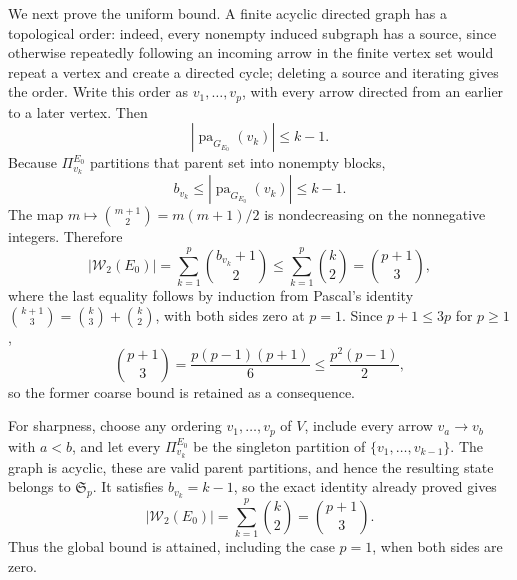 We next prove the uniform bound.  A finite acyclic directed graph has a topological order: indeed, every nonempty induced subgraph has a source, since otherwise repeatedly following an incoming arrow in the finite vertex set would repeat a vertex and create a directed cycle; deleting a source and iterating gives the order.  Write this order as \(v_1,\ldots,v_p\), with every arrow directed from an earlier to a later vertex.  Then
\[
|\operatorname{pa}_{G_{E_0}}(v_k)|\leq k-1.
\]
Because \(\Pi^{E_0}_{v_k}\) partitions that parent set into nonempty blocks,
\[
b_{v_k}\leq|\operatorname{pa}_{G_{E_0}}(v_k)|\leq k-1.
\]
The map \(m\mapsto\binom{m+1}{2}=m(m+1)/2\) is nondecreasing on the nonnegative integers.  Therefore
\[
|\mathcal W_2(E_0)|
=\sum_{k=1}^{p}\binom{b_{v_k}+1}{2}
\leq\sum_{k=1}^{p}\binom{k}{2}
=\binom{p+1}{3},
\]
where the last equality follows by induction from Pascal's identity \(\binom{k+1}{3}=\binom{k}{3}+\binom{k}{2}\), with both sides zero at \(p=1\).  Since \(p+1\leq3p\) for \(p\geq1\),
\[
\binom{p+1}{3}
=\frac{p(p-1)(p+1)}{6}
\leq\frac{p^2(p-1)}{2},
\]
so the former coarse bound is retained as a consequence.

For sharpness, choose any ordering \(v_1,\ldots,v_p\) of \(V\), include every arrow \(v_a\to v_b\) with \(a<b\), and let every \(\Pi^{E_0}_{v_k}\) be the singleton partition of \(\{v_1,\ldots,v_{k-1}\}\).  The graph is acyclic, these are valid parent partitions, and hence the resulting state belongs to \(\mathfrak S_p\).  It satisfies \(b_{v_k}=k-1\), so the exact identity already proved gives
\[
|\mathcal W_2(E_0)|
=\sum_{k=1}^{p}\binom{k}{2}
=\binom{p+1}{3}.
\]
Thus the global bound is attained, including the case \(p=1\), when both sides are zero.
